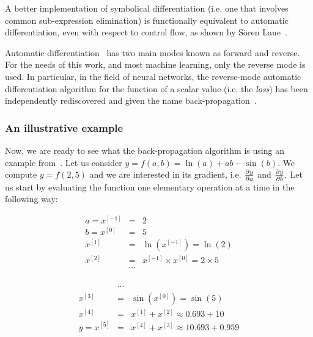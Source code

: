 \documentclass[pdflatex,sn-mathphys-num]{sn-jnl}%
\theoremstyle{thmstyleone}%
\theoremstyle{thmstyletwo}%
\theoremstyle{thmstylethree}%
\begin{document}
A better implementation of symbolical differentiation (i.e. one that involves
common sub-expression elimination) is functionally equivalent to automatic
differentiation, even with respect to control flow, as shown by S\"oren
Laue~\cite{laue2019}.

Automatic differentiation~\cite{baydin2017} has two main modes known as forward
and reverse. For the needs of this work, and most machine learning, only the
reverse mode is used.  In particular, in the field of neural networks, the
reverse-mode automatic differentiation algorithm for the function of a scalar
value (i.e. the \emph{loss}) has been independently rediscovered and given the name back-propagation~\cite{rumelhart1986}.

\subsubsection{An illustrative example}\label{sec:backprop-example}

Now, we are ready to see what the back-propagation algorithm is using an example
from~\cite{baydin2017}. Let us consider \(y = f(a,b) = \ln(a) + a b - \sin(b)\).  We
compute \(y = f(2,5)\) and we are interested in its gradient, i.e.
\(\textstyle\frac{\partial y}{\partial a}\) and \(\textstyle\frac{\partial y}{\partial b}.\) Let us start by evaluating the
function one elementary operation at a time in the following way:

\begin{minipage}{.4\textwidth}
\begin{eqnarray*}
a = x^{[-1]} &=& 2 \\
b = x^{[0]}  &=& 5 \\
    x^{[1]}  &=& \ln\left(x^{[-1]}\right) = \ln(2) \\
    x^{[2]}  &=& x^{[-1]} \times x^{[0]} = 2 \times 5 \\
             &\cdots& \\
\end{eqnarray*}
\end{minipage}%
\begin{minipage}{.55\textwidth}
\begin{eqnarray*}
             &\cdots&\\
    x^{[3]}  &=& \sin\left(x^{[0]}\right) = \sin(5) \\
    x^{[4]}  &=& x^{[1]} + x^{[2]} \approx 0.693 + 10 \\
y = x^{[5]}  &=& x^{[4]} + x^{[3]} \approx 10.693 + 0.959 \\
&\phantom-&\\
\end{eqnarray*}
\end{minipage}
\end{document}
